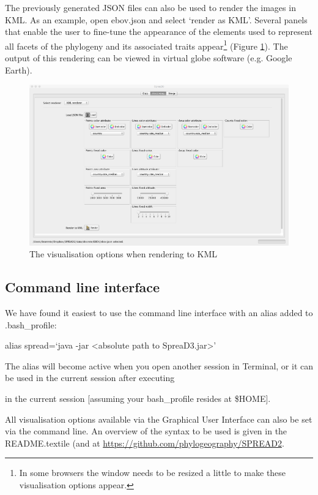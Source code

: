 \documentclass[english]{paper}
\newenvironment{lyxcode}
{\par\begin{list}{}{
\setlength{\rightmargin}{\leftmargin}
\setlength{\listparindent}{0pt}%
\raggedright
\setlength{\itemsep}{0pt}
\setlength{\parsep}{0pt}
\normalfont\ttfamily}%
 \item[]}
{\end{list}}
\begin{document}
The previously generated JSON files can also be used to render the images in KML. 
As an example, open ebov.json and select `render as KML'.
Several panels that enable the user to fine-tune the appearance of the elements used to represent all facets of the phylogeny and its associated traits appear\footnote{In some browsers the window needs to be resized a little to make these visualisation options appear.} (Figure \ref{fig:KMLrender}).
The output of this rendering can be viewed in virtual globe software (e.g. Google Earth).

\begin{figure}[!H]
\centering
\includegraphics[width=1\textwidth]{./figures/kml_render.pdf} 
\caption{The visualisation options when rendering to KML}
\label{fig:KMLrender}
\end{figure}


\subsection{Command line interface\label{CLI}}

We have found it easiest to use the command line interface with an alias added to .bash\_profile:

\begin{lyxcode}
alias spread=`java -jar <absolute path to SpreaD3.jar>' 
\end{lyxcode}

\noindent
The alias will become active when you open another session in Terminal, or it can be used in the current session after executing


\noindent
in the current session  [assuming your bash\_profile resides at \$HOME]. 
\par
All visualisation options available via the Graphical User Interface can also be set via the command line. 
An overview of the syntax to be used is given in the README.textile (and at \url{https://github.com/phylogeography/SPREAD2}.


 
\end{document}
